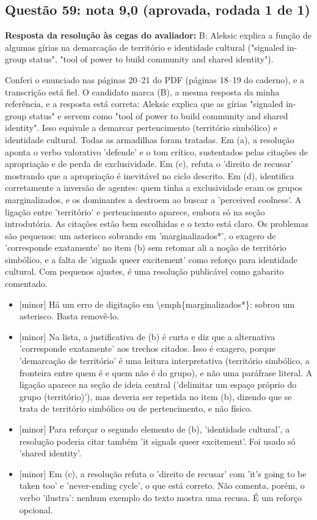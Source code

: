 \documentclass{article}%
\begin{document}
\subsection*{Questão 59: nota 9,0 (aprovada, rodada 1 de 1)}%
\textbf{Resposta da resolução às cegas do avaliador:} B: Aleksic explica a função de algumas gírias na demarcação de território e identidade cultural ("signaled in{-}group status", "tool of power to build community and shared identity").\par %
Conferi o enunciado nas páginas 20--21 do PDF (páginas 18--19 do caderno), e a transcrição está fiel. O candidato marca (B), a mesma resposta da minha referência, e a resposta está correta: Aleksic explica que as gírias "signaled in{-}group status" e servem como "tool of power to build community and shared identity". Isso equivale a demarcar pertencimento (território simbólico) e identidade cultural. Todas as armadilhas foram tratadas. Em (a), a resolução aponta o verbo valorativo 'defende' e o tom crítico, sustentados pelas citações de apropriação e de perda de exclusividade. Em (c), refuta o 'direito de recusar' mostrando que a apropriação é inevitável no ciclo descrito. Em (d), identifica corretamente a inversão de agentes: quem tinha a exclusividade eram os grupos marginalizados, e os dominantes a destroem ao buscar a 'perceived coolness'. A ligação entre 'território' e pertencimento aparece, embora só na seção introdutória. As citações estão bem escolhidas e o texto está claro. Os problemas são pequenos: um asterisco sobrando em 'marginalizados*', o exagero de 'corresponde exatamente' no item (b) sem retomar ali a noção de território simbólico, e a falta de 'signals queer excitement' como reforço para identidade cultural. Com pequenos ajustes, é uma resolução publicável como gabarito comentado.%
\begin{itemize}%
\item%
{[}minor{]} Há um erro de digitação em \textbackslash{}emph\{marginalizados*\}: sobrou um asterisco. Basta removê{-}lo.%
\item%
{[}minor{]} Na lista, a justificativa de (b) é curta e diz que a alternativa 'corresponde exatamente' aos trechos citados. Isso é exagero, porque 'demarcação de território' é uma leitura interpretativa (território simbólico, a fronteira entre quem é e quem não é do grupo), e não uma paráfrase literal. A ligação aparece na seção de ideia central ('delimitar um espaço próprio do grupo (território)'), mas deveria ser repetida no item (b), dizendo que se trata de território simbólico ou de pertencimento, e não físico.%
\item%
{[}minor{]} Para reforçar o segundo elemento de (b), 'identidade cultural', a resolução poderia citar também 'it signals queer excitement'. Foi usado só 'shared identity'.%
\item%
{[}minor{]} Em (c), a resolução refuta o 'direito de recusar' com 'it's going to be taken too' e 'never{-}ending cycle', o que está correto. Não comenta, porém, o verbo 'ilustra': nenhum exemplo do texto mostra uma recusa. É um reforço opcional.%
\end{itemize}%
\end{document}
